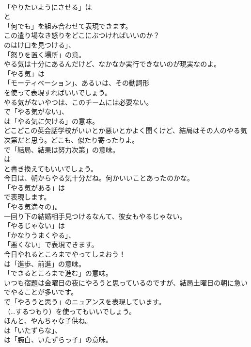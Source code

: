\documentclass[8pt]{extreport}
\begin{document}
\begin{CJK}{UTF8}{min}
\\	「やりたいようにさせる」は
\\	と
\\	「何でも」を組み合わせて表現できます。	
\\	この遣り場なき怒りをどこにぶつければいいのか？ 
\\	のはけ口を見つける」、
\\	「怒りを置く場所」の意。	
\\	やる気は十分にあるんだけど、なかなか実行できないのが現実なのよ。 
\\	「やる気」は
\\	「モーティベーション」、あるいは、その動詞形
\\	を使って表現すればいいでしょう。	
\\	やる気がないやつは、このチームには必要ない。 
\\	で「やる気がない」、
\\	は「やる気に欠ける」の意味。	
\\	どこどこの英会話学校がいいとか悪いとかよく聞くけど、結局はその人のやる気次第だと思う。どこも、似たり寄ったりよ。 
\\	で「結局、結果は努力次第」の意味。
\\	は
\\	と書き換えてもいいでしょう。	
\\	今日は、朝からやる気十分だね。何かいいことあったのかな。 
\\	「やる気がある」は
\\	で表現します。
\\	「やる気満々の」。	
\\	一回り下の結婚相手見つけるなんて、彼女もやるじゃない。 
\\	「やるじゃない」は
\\	「かなりうまくやる」、
\\	「悪くない」で表現できます。	
\\	今日やれるところまでやってしまおう！ 
\\	は「進歩、前進」の意味。
\\	「できるところまで進む」の意味。	
\\	いつも宿題は金曜日の夜にやろうと思っているのですが、結局土曜日の朝に急いでやることが多いです。 
\\	で「やろうと思う」のニュアンスを表現しています。
\\	（…するつもり）を使ってもいいでしょう。	
\\	ほんと、やんちゃな子供ね。 
\\	は「いたずらな」、
\\	は「腕白、いたずらっ子」の意味。	

\end{CJK}
\end{document}
